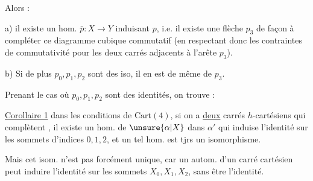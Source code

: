 
Alors :

a) il existe un hom. $\bar p:X\to Y$ induisant $p$, i.e. il existe une flèche $p_3$ de façon à compléter ce diagramme cubique commutatif (en respectant donc les contraintes de commutativité pour les deux carrés adjacents à l'arête $p_3$).

b) Si de plus $p_0,p_1,p_2$ sont des iso, il en est de même de $p_3$.

Prenant le cas où $p_0,p_1,p_2$ sont des identités, on trouve :

\uline{Corollaire 1} dans les conditions de $\mathrm{Cart}(4)$, si on a \uline{deux} carrés $h$-cartésiens  qui complètent
, il existe un hom. de $\unsure{\alpha|X}$ dans $\alpha'$ qui induise l'identité sur les sommets d'indices $0,1,2$, et un tel hom. est tjrs un isomorphisme.

Mais cet isom. n'est pas forcément unique, car   un autom. d'un carré  cartésien peut induire l'identité sur les sommets $X_0,X_1,X_2$, sans être l'identité.

